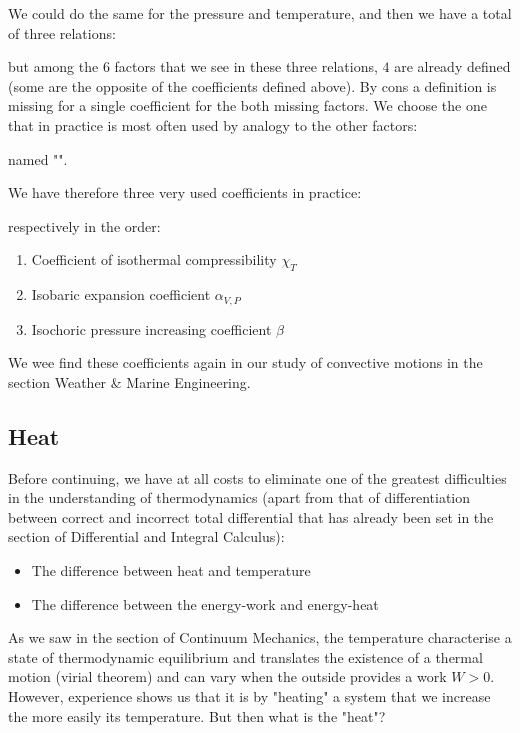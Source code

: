 	We could do the same for the pressure and temperature, and then we have a total of three relations:
	
	but among the $6$ factors that we see in these three relations, $4$ are already defined (some are the opposite of the coefficients defined above). By cons a definition is missing for a single coefficient for the both missing factors. We choose the one that in practice is most often used by analogy to the other factors:
	
	named "".

	We have therefore three very used coefficients in practice:
	
	respectively in the order:
	\begin{enumerate}
		\item Coefficient of isothermal compressibility $\chi_T$

		\item Isobaric expansion coefficient $\alpha_{V,P}$

		\item Isochoric pressure increasing coefficient $\beta$
	 \end{enumerate}
	
	
	We wee find these coefficients again in our study of convective motions in the section Weather \& Marine Engineering.
	
	\subsection{Heat}
	Before continuing, we have at all costs to eliminate one of the greatest difficulties in the understanding of thermodynamics (apart from that of differentiation between correct and incorrect total differential that has already been set in the section of Differential and Integral Calculus):
	\begin{itemize}
		\item The difference between heat and temperature

		\item The difference between the energy-work and energy-heat
	\end{itemize}
	As we saw in the section of Continuum Mechanics, the temperature characterise a state of thermodynamic equilibrium and translates the existence of a thermal motion (virial theorem) and can vary when the outside provides a work $W>0$. However, experience shows us that it is by "heating" a system that we increase the more easily its temperature. But then what is the "heat"?
	
